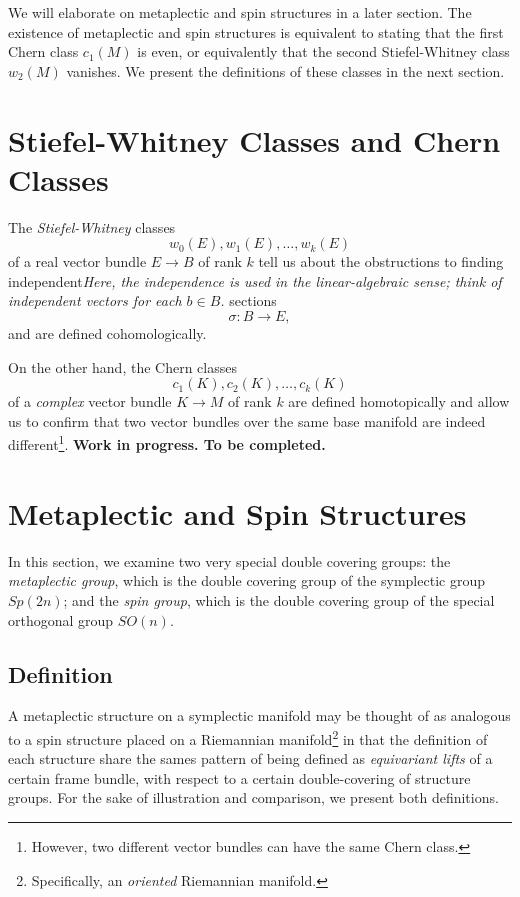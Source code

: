 \documentclass{tufte-handout}
\begin{document}
We will elaborate on metaplectic and spin structures in a later section. The existence of metaplectic and spin structures is equivalent to stating that the first Chern class $c_1(M)$ is even, or equivalently that the second Stiefel-Whitney class $w_2(M)$ vanishes. We present the definitions of these classes in the next section.

\section{Stiefel-Whitney Classes and Chern Classes}
The \emph{Stiefel-Whitney} classes
$$
w_0(E), w_1(E), \ldots, w_k(E)
$$
of a real vector bundle $E \to B$ of rank $k$ tell us about the obstructions to finding independent\emph{Here, the independence is used in the linear-algebraic sense; think of independent vectors for each $b \in B$.} sections
$$
\sigma: B \to E,
$$
and are defined cohomologically.

On the other hand, the Chern classes
$$
c_1(K), c_2(K), \ldots, c_k(K)
$$
of a \emph{complex} vector bundle $K \to M$ of rank $k$ are defined homotopically and allow us to confirm that two vector bundles over the same base manifold are indeed different\footnote{However, two different vector bundles can have the same Chern class.}.
\textbf{Work in progress. To be completed.}

\section{Metaplectic and Spin Structures}
In this section, we examine two very special double covering groups: the \emph{metaplectic group}, which is the double covering group of the symplectic group $Sp(2n)$; and the \emph{spin group}, which is the double covering group of the special orthogonal group $SO(n)$.
\subsection{Definition}
A metaplectic structure on a symplectic manifold may be thought of as analogous to a spin structure placed on a Riemannian manifold\footnote{Specifically, an \emph{oriented} Riemannian manifold.} in that the definition of each structure share the sames pattern of being defined as \emph{equivariant lifts} of a certain frame bundle, with respect to a certain double-covering of structure groups. For the sake of illustration and comparison, we present both definitions.
\end{document}
